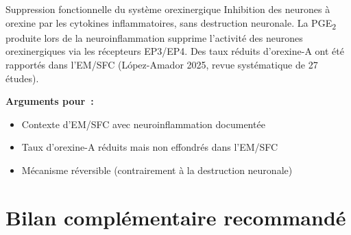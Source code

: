 \documentclass[11pt,a4paper]{article}
\begin{document}
\begin{hypothesis}{Suppression fonctionnelle du système orexinergique}
Inhibition des neurones à orexine par les cytokines inflammatoires, sans destruction neuronale. La PGE\textsubscript{2} produite lors de la neuroinflammation supprime l'activité des neurones orexinergiques via les récepteurs EP3/EP4. Des taux réduits d'orexine-A ont été rapportés dans l'EM/SFC (López-Amador 2025, revue systématique de 27 études).

\textbf{Arguments pour~:}
\begin{itemize}[nosep]
    \item Contexte d'EM/SFC avec neuroinflammation documentée
    \item Taux d'orexine-A réduits mais non effondrés dans l'EM/SFC
    \item Mécanisme réversible (contrairement à la destruction neuronale)
\end{itemize}
\end{hypothesis}

\section{Bilan complémentaire recommandé}
\label{sec:bilan}
\end{document}
